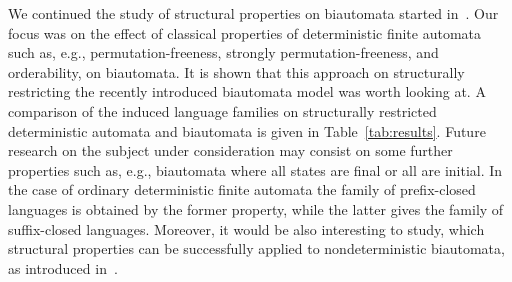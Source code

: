 \documentclass[submission]{eptcs}
\begin{document}
We continued the study of structural properties on biautomata started
in~\cite{HoJa13c,KlPo12a,KlPo12}. Our focus was on the effect of
classical properties of deterministic finite automata such as, e.g.,
permutation-freeness, strongly permutation-freeness, and orderability,
on biautomata. It is shown that this approach on structurally
restricting the recently introduced biautomata model was worth looking
at. A comparison of the induced language families on structurally
restricted deterministic automata and biautomata is given in
Table~\ref{tab:results}. Future research on the subject under
consideration may consist on some further properties such as, e.g.,
biautomata where all states are final or all are initial. In the case
of ordinary deterministic finite automata the family of prefix-closed
languages is obtained by the former property, while the latter gives
the family of suffix-closed languages. Moreover, it would be also
interesting to study, which structural properties can be successfully
applied to nondeterministic biautomata, as introduced
in~\cite{HoJa13a}.
\end{document}
